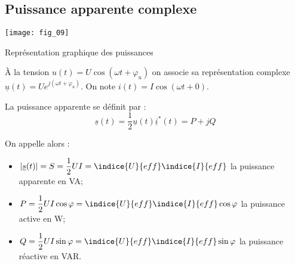 \subsection{Puissance apparente complexe}




\begin{marginfigure}
\texttt{[image: fig\_09]}
\caption{Représentation graphique des puissances\label{fig:ge:cours:fig_09}}
\end{marginfigure}

\begin{defi}
À la tension $u(t)=U\cos\left( \omega t + \varphi_u\right)$ on associe sa représentation complexe 
$\underline{u}(t)=Ue^{j\left( \omega t + \varphi_u\right)}$.
On note  $i(t)=I\cos\left( \omega t + 0\right)$.%

La puissance apparente se définit par : 
$$ \underline{s}(t) = \dfrac{1}{2}\underline{u}(t)\underline{i}^*(t) = P + j Q $$ 
%
%

On appelle alors :
\begin{itemize}
\item $|\underline{s}(t)| = S = \dfrac{1}{2}UI = \indice{U}{eff}\indice{I}{eff}$ la puissance apparente en \si{VA};
\item $P = \dfrac{1}{2}UI\cos\varphi = \indice{U}{eff}\indice{I}{eff} \cos\varphi$ la puissance active en \si{W};
\item $Q = \dfrac{1}{2}UI\sin\varphi = \indice{U}{eff}\indice{I}{eff} \sin\varphi$ la puissance réactive en \si{VAR}.
\end{itemize}
\end{defi}





